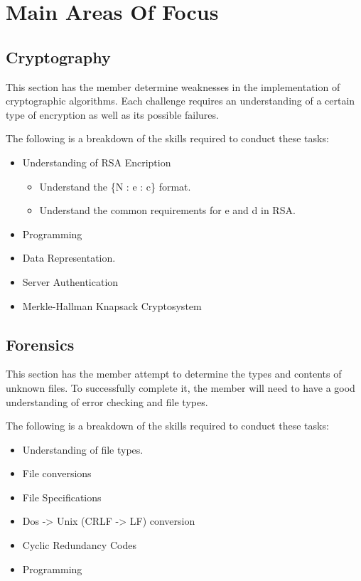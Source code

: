 \documentclass[a4paper,11pt]{report}
\begin{document}
	\section{Main Areas Of Focus}
		\subsection{Cryptography}
			This section has the member determine weaknesses in the implementation of cryptographic algorithms. 
			Each challenge requires an understanding of a certain type of encryption as well as its possible failures. 


			The following is a breakdown of the skills required to conduct these tasks:
			\begin{itemize}
				\item Understanding of RSA Encription
				\begin{itemize}
					\item Understand the \{N : e : c\} format. 
						\item Understand the common requirements for e and d in RSA. 
				\end{itemize}
				\item Programming
				\item Data Representation. 
				\item Server Authentication
				\item Merkle-Hallman Knapsack Cryptosystem
			\end{itemize}
		\subsection{Forensics}
			This section has the member attempt to determine the types and contents of unknown files. 
			To successfully complete it, the member will need to have a good understanding of error checking and file types. 

			The following is a breakdown of the skills required to conduct these tasks:
			\begin{itemize}
				\item Understanding of file types. 
				\item File conversions
				\item File Specifications
				\item Dos -> Unix (CRLF -> LF) conversion
				\item Cyclic Redundancy Codes
				\item Programming
			\end{itemize}
\end{document}
